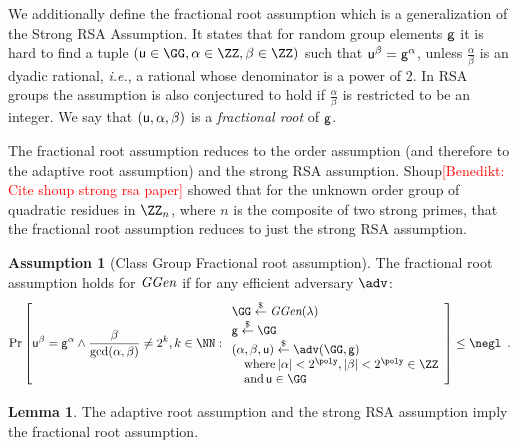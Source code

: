 \documentclass{article}
\theoremstyle{definition}
\newtheorem{lemma}{Lemma}
\newtheorem{assumption}{Assumption}
\newcommand{\benedikt}[1]{{\textcolor{red}{[Benedikt: #1]}}}
\newcommand{\benedikt}[1]{}
\begin{document}
	
We additionally define the fractional root assumption which is a generalization of the Strong RSA Assumption. It states that for random group elements $\mathsf{g}$ it is hard to find a tuple $(\gr{u}\in \GG,\alpha\in \ZZ,\beta\in \ZZ)$ such that $\mathsf{u}^{\beta}=\mathsf{g}^{\alpha}$, unless $\frac{\alpha}{\beta}$ is an dyadic rational, \emph{i.e.}, a rational whose denominator is a power of $2$. In RSA groups the assumption is also conjectured to hold if $\frac{\alpha}{\beta}$ is restricted to be an integer. We say that $(\mathsf{u},\alpha,\beta)$ is a \emph{fractional root} of $\mathsf{g}$.

 The fractional root assumption reduces to the order assumption (and therefore to the adaptive root assumption) and the strong RSA assumption. Shoup\benedikt{Cite shoup strong rsa paper} showed that for the unknown order group of quadratic residues in $\ZZ_n$, where $n$ is the composite of two strong primes, that the fractional root assumption reduces to just the strong RSA assumption.
\begin{assumption}[Class Group Fractional root assumption]
\label{assum:fracroot}
The fractional root assumption holds for $\textit{GGen}$ if for any efficient adversary $\adv$:
\[        
                \Pr\left[\gr{u}^\beta = \gr{g}^{\alpha} \wedge \frac{\beta}{\gcd(\alpha,\beta)}\neq 2^k,  k \in \NN   : 
                \begin{array}{l} 
                      \GG \sample \ggen(\lambda) \\ 
                      \gr{g} \sample \GG \\
                      (\alpha, \beta, \gr{u}) \sample \adv(\GG, \gr{g}) \\
                      \quad \textnormal{where} \, |\alpha|<2^{\poly}, |\beta|<2^{\poly} \in \ZZ \\
                      \quad \textnormal{and} \, \gr{u} \in \GG 
                \end{array} 
        \right] \leq \negl \enspace .
\]
\end{assumption}
\begin{lemma}
	The adaptive root assumption and the strong RSA assumption imply the fractional root assumption.
\end{lemma}
\end{document}
